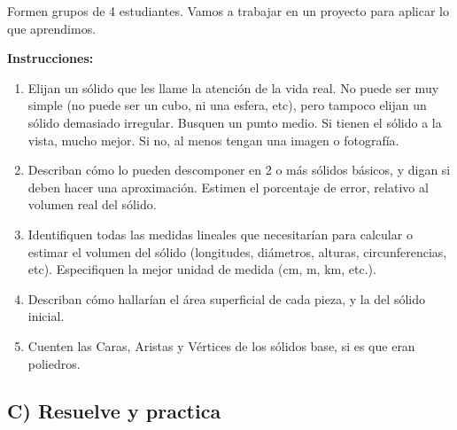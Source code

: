 \documentclass[12pt,a4paper]{article}
\begin{document}
\begin{tcolorbox}[colback=fondorosa, colframe=rojoclaro, title=\textbf{PROYECTO GRUPAL - APLIQUEMOS LO APRENDIDO}, breakable]
Formen grupos de 4 estudiantes. Vamos a trabajar en un proyecto para aplicar lo que aprendimos.

\textbf{Instrucciones:}

\begin{enumerate}[nosep]
    \item Elijan un sólido que les llame la atención de la vida real. No puede ser muy simple (no puede ser un cubo, ni una esfera, etc), pero tampoco elijan un sólido demasiado irregular. Busquen un punto medio. Si tienen el sólido a la vista, mucho mejor. Si no, al menos tengan una imagen o fotografía.

    \item Describan cómo lo pueden descomponer en 2 o más sólidos básicos, y digan si deben hacer una aproximación. Estimen el porcentaje de error, relativo al volumen real del sólido.

    \item Identifiquen todas las medidas lineales que necesitarían para calcular o estimar el volumen del sólido (longitudes, diámetros, alturas, circunferencias, etc). Especifiquen la mejor unidad de medida (cm, m, km, etc.).

    \item Describan cómo hallarían el área superficial de cada pieza, y la del sólido inicial.

    \item Cuenten las Caras, Aristas y Vértices de los sólidos base, si es que eran poliedros.
\end{enumerate}
\end{tcolorbox}

\vspace{4mm}


\subsection*{C) Resuelve y practica}
\end{document}
